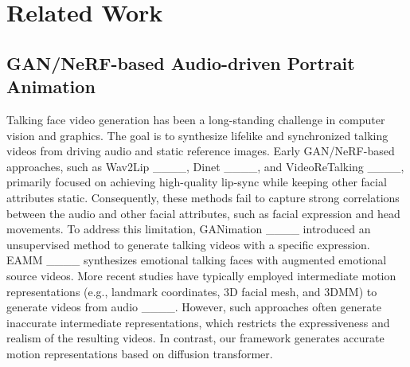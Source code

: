 \section{Related Work}
\subsection{GAN/NeRF-based Audio-driven Portrait Animation}
Talking face video generation has been a long-standing challenge in computer vision and graphics. The goal is to synthesize lifelike and synchronized talking videos from driving audio and static reference images. Early GAN/NeRF-based approaches, such as Wav2Lip ____, Dinet ____, and VideoReTalking ____, primarily focused on achieving high-quality lip-sync while keeping other facial attributes static. Consequently, these methods fail to capture strong correlations between the audio and other facial attributes, such as facial expression and head movements. To address this limitation, GANimation ____ introduced an unsupervised method to generate talking videos with a specific expression. EAMM ____ synthesizes emotional talking faces with augmented emotional source videos. More recent studies have typically employed intermediate motion representations (e.g., landmark coordinates, 3D facial mesh, and 3DMM) to generate videos from audio ____. However, such approaches often generate inaccurate intermediate representations, which restricts the expressiveness and realism of the resulting videos. In contrast, our framework generates accurate motion representations based on diffusion transformer. 

